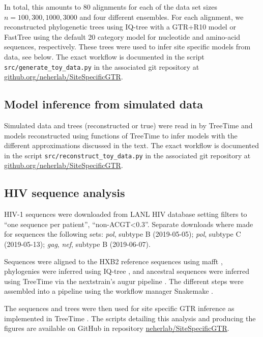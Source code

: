 \documentclass[aps,rmp,twocolumn]{revtex4}
\newcommand{\gene}[1]{{\it #1}}
\begin{document}
In total, this amounts to 80 alignments for each of the data set sizes $n=100,300,1000,3000$ and four different ensembles.
For each alignment, we reconstructed phylogenetic trees using IQ-tree \citep{nguyen_iq-tree:_2015} with a GTR+R10 model or FastTree \citep{FastTree} using the default 20 category model for nucleotide and amino-acid sequences, respectively.
These trees were used to infer site specific models from data, see below.
The exact workflow is documented in the script \texttt{src/generate\_toy\_data.py} in the associated git repository at \href{https://github.org/neherlab/SiteSpecificGTR}{github.org/neherlab/SiteSpecificGTR}.

\subsection*{Model inference from simulated data}
Simulated data and trees (reconstructed or true) were read in by TreeTime and models reconstructed using functions of TreeTime to infer models with the different approximations discussed in the text.
The exact workflow is documented in the script \texttt{src/reconstruct\_toy\_data.py} in the associated git repository at \href{https://github.org/neherlab/SiteSpecificGTR}{github.org/neherlab/SiteSpecificGTR}.

\subsection*{HIV sequence analysis}
HIV-1 sequences were downloaded from LANL HIV database \citep{LANL} setting filters to ``one sequence per patient'', ``non-ACGT\textless 0.3''.
Separate downloads where made for sequences the following sets: \gene{pol}, subtype B (2019-05-05); \gene{pol}, subtype C (2019-05-13); \gene{gag}, \gene{nef}, subtype B (2019-06-07).

Sequences were aligned to the HXB2 reference sequences using mafft \citep{katoh2013mafft}, phylogenies were inferred using IQ-tree \citep{nguyen_iq-tree:_2015}, and ancestral sequences were inferred using TreeTime \citep{sagulenko2017treetime} via the nextstrain's augur pipeline \citep{hadfield_nextstrain:_2018}.
The different steps were assembled into a pipeline using the workflow manager Snakemake \citep{koster_snakemakescalable_2012}.

The sequences and trees were then used for site specific GTR inference as implemented in TreeTime \citep{sagulenko2017treetime}.
The scripts detailing this analysis and producing the figures are available on GitHub in repository \href{https://github.com/neherlab/SiteSpecificGTR}{neherlab/SiteSpecificGTR}.
\end{document}
